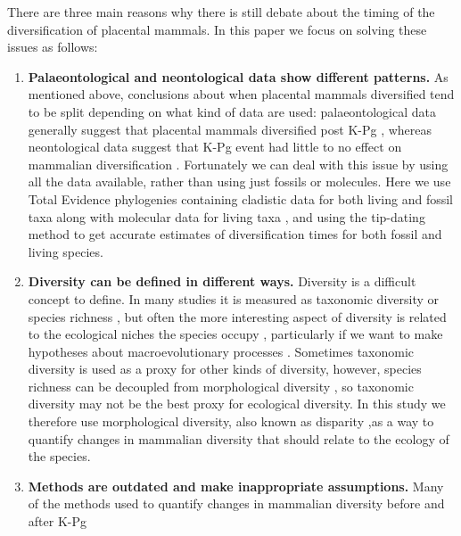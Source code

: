 \documentclass[12pt,letterpaper]{article}
\begin{document}
There are three main reasons why there is still debate about the timing of the diversification of placental mammals. In this paper we focus on solving these issues as follows: 
  \begin{enumerate}
    \item \textbf{Palaeontological and neontological data show different patterns.}
    As mentioned above, conclusions about when placental mammals diversified tend to be split depending on what kind of data are used: palaeontological data generally suggest that placental mammals diversified post K-Pg \citep[e.g.][]{O'Leary08022013}, whereas neontological data suggest that K-Pg event had little to no effect on mammalian diversification \citep{bininda2007delayed,meredithimpacts2011,Stadler12042011}. 
    Fortunately we can deal with this issue by using all the data available, rather than using just fossils or molecules. 
    Here we use Total Evidence phylogenies containing cladistic data for both living and fossil taxa along with molecular data for living taxa \citep{eernissetaxonomic1993,ronquista2012}, and using the tip-dating method \citep{ronquista2012,Wood01032013} to get accurate estimates of diversification times for both fossil and living species.
    \item \textbf{Diversity can be defined in different ways.}
    Diversity is a difficult concept to define. 
    In many studies it is measured as taxonomic diversity or species richness \citep{Stadler12042011,meredithimpacts2011,O'Leary08022013}, but often the more interesting aspect of diversity is related to the ecological niches the species occupy \citep{Wesley-Hunt2005,Brusatte12092008,toljagictriassic-jurassic2013}, particularly if we want to  make hypotheses about macroevolutionary processes \citep{Pearman2008149,OlsonRadiation,Losos2010,glor2010phylogenetic}.
    Sometimes taxonomic diversity is used as a proxy for other kinds of diversity, however, species richness can be decoupled from morphological diversity \citep{slaterCetacean,ruta2013,hopkinsdecoupling2013}, so taxonomic diversity may not be the best proxy for ecological diversity.
    In this study we therefore use morphological diversity, also known as disparity \citep[e.g.][]{Wills1994,Hughes20082013},as a way to quantify changes in mammalian diversity that should relate to the ecology of the species.
    \item \textbf{Methods are outdated and make inappropriate assumptions.}
    Many of the methods used to quantify changes in mammalian diversity before and after K-Pg 

\end{enumerate}
\end{document}
